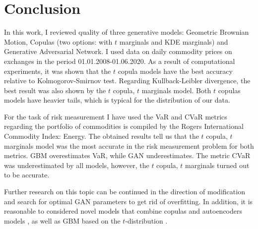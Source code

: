 \documentclass{article}
\begin{document}
\section{Conclusion}
\label{section:conclustion}
In this work, I reviewed quality of three generative models: Geometric Brownian Motion, Copulas (two options: with $t$ marginals and KDE marginals) and Generative Adversarial Network. I used data on daily commodity prices on exchanges in the period 01.01.2008-01.06.2020. As a result of computational experiments, it was shown that the $t$ copula models have the best accuracy relative to Kolmogorov-Smirnov test. Regarding Kullback-Leibler divergence, the best result was also shown by the $t$ copula, $t$ marginals model. Both $t$ copulas models have heavier tails, which is typical for the  distribution of our data.

For the task of risk measurement I have used the VaR and CVaR metrics regarding the portfolio of commodities is compiled by the Rogers International Commodity Index: Energy. The obtained results tell us that the $t$ copula, $t$ marginals model was the most accurate in the risk measurement problem for both metrics. GBM overestimates VaR, while GAN underestimates. The metric CVaR was underestimated by all models, however, the $t$ copula, $t$ marginals turned out to be accurate.

Further research on this topic can be continued in the direction of modification and search for optimal GAN parameters to get rid of overfitting. In addition, it is reasonable to considered novel models that combine copulas and autoencoders models \cite{tagasovska2019copulas}, as well as GBM based on the $t$-distribution \cite{Nkemnole}.

\newpage

\end{document}

